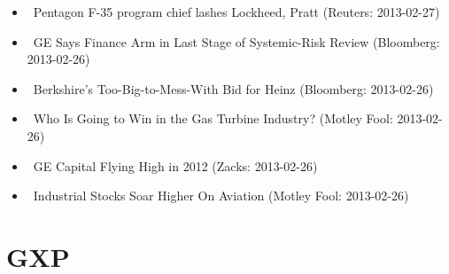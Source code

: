 \documentclass[11pt,asymmetric]{article}
\begin{document}
\begin{itemize}
\item\ Pentagon F-35 program chief lashes Lockheed, Pratt (Reuters: 2013-02-27)
\item\ GE Says Finance Arm in Last Stage of Systemic-Risk Review (Bloomberg: 2013-02-26)
\item\ Berkshire’s Too-Big-to-Mess-With Bid for Heinz (Bloomberg: 2013-02-26)
\item\ Who Is Going to Win in the Gas Turbine Industry? (Motley Fool: 2013-02-26)
\item\ GE Capital Flying High in 2012 (Zacks: 2013-02-26)
\item\ Industrial Stocks Soar Higher On Aviation (Motley Fool: 2013-02-26)
\end{itemize}

\section*{GXP}
\end{document}
